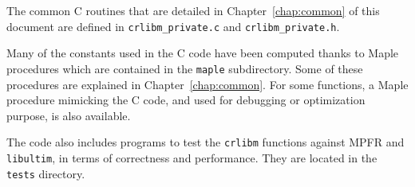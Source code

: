 The common C routines that are detailed in Chapter~\ref{chap:common} of
this document are defined in \texttt{crlibm\_private.c} and
\texttt{crlibm\_private.h}.

Many of the constants used in the C code have been computed thanks to
Maple procedures which are contained in the \texttt{maple}
subdirectory. Some of these procedures are explained in
Chapter~\ref{chap:common}. For some functions, a Maple procedure
mimicking the C code, and used for debugging or optimization purpose,
is also available.


The code also includes programs to test the \texttt{crlibm} functions
against MPFR and \texttt{libultim}, in terms of correctness and
performance. They are located in the \texttt{tests} directory.

